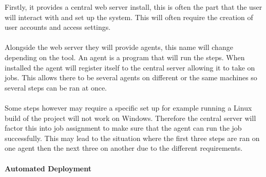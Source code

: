 Firstly, it provides a central web server install, this is often the part that the user will interact with and set up the system. This will often require the creation of user accounts and access settings.
\\\\
Alongside the web server they will provide agents, this name will change depending on the tool. An agent is a program that will run the steps. When installed the agent will register itself to the central server allowing it to take on jobs. This allows there to be several agents on different or the same machines so several steps can be ran at once.
\\\\
Some steps however may require a specific set up for example running a Linux build of the project will not work on Windows. Therefore the central server will factor this into job assignment to make sure that the agent can run the job successfully. This may lead to the situation where the first three steps are ran on one agent then the next three on another due to the different requirements.

\paragraph{Automated Deployment}

